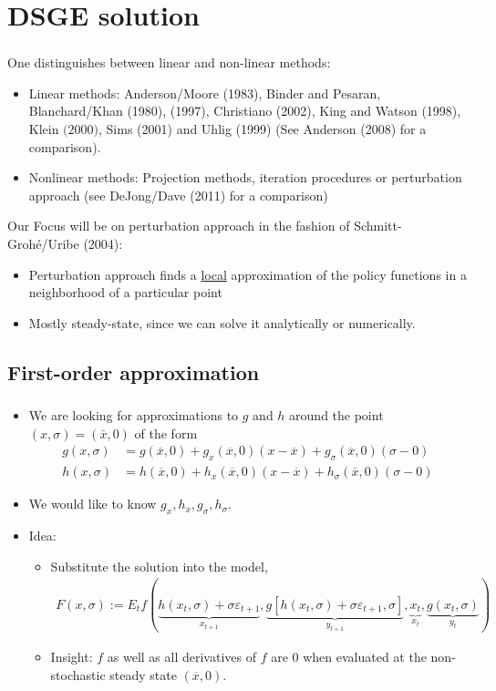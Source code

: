 \documentclass[handout]{beamer}  %
\begin{document}
\section{DSGE solution}
\begin{frame}
\frametitle{\secname}
One distinguishes between linear and non-linear methods:
    \begin{itemize}
   \item Linear methods: Anderson/Moore (1983), Binder and Pesaran, Blanchard/Khan (1980),
       (1997), Christiano (2002), King and Watson (1998), $\boxed{\text{Klein (2000)}}$, Sims (2001) and Uhlig (1999) (See Anderson (2008) for a comparison).
   \item Nonlinear methods: Projection methods, iteration procedures or perturbation approach (see DeJong/Dave (2011) for a comparison)
\end{itemize}
Our Focus will be on perturbation approach in the fashion of Schmitt-Groh\'{e}/Uribe (2004):
\begin{itemize}
\item Perturbation approach finds a \underline{local} approximation of the policy functions in a neighborhood of a particular point
\item Mostly steady-state, since we can solve it analytically or numerically.
\end{itemize}
\end{frame}

\subsection{First-order approximation}
\begin{frame}
\frametitle{\secname}\framesubtitle{\subsecname}
\begin{itemize}
\item We are looking for approximations to $g$ and $h$ around the point $(x,\sigma)=(\bar{x},0)$ of the form
\begin{align*}
  g(x,\sigma) &= g(\overline{x},0) + g_x(\overline{x},0)(x-\overline{x}) + g_\sigma(\overline{x},0)(\sigma-0)\\
  h(x,\sigma) &= h(\overline{x},0) + h_x(\overline{x},0)(x-\overline{x}) + h_\sigma(\overline{x},0)(\sigma-0)
\end{align*}
\item We would like to know $g_x,h_x,g_\sigma,h_\sigma$.
\item Idea:
\begin{itemize}
\item Substitute the solution into the model,
\begin{align*}
F(x,\sigma):=E_t f \left( \underbrace{h(x_{t},\sigma)+\sigma \varepsilon_{t+1}}_{x_{t+1}},\underbrace{g[h(x_{t},\sigma)+\sigma \varepsilon_{t+1},\sigma]}_{y_{t+1}},\underbrace{x_t}_{x_t},\underbrace{g(x_t,\sigma)}_{y_t} \right)
\end{align*}
\item Insight: $f$ as well as all derivatives of $f$ are $0$ when evaluated at the non-stochastic steady state $(\overline{x},0)$.
\end{itemize}
\end{itemize}
\end{frame}
\end{document}
